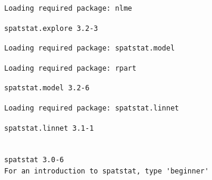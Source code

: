 \documentclass[
  letterpaper,
  DIV=11,
  numbers=noendperiod]{scrartcl}
\newenvironment{Shaded}{\begin{snugshade}}{\end{snugshade}}
\newcommand{\AttributeTok}[1]{\textcolor[rgb]{0.40,0.45,0.13}{#1}}
\newcommand{\FunctionTok}[1]{\textcolor[rgb]{0.28,0.35,0.67}{#1}}
\newcommand{\NormalTok}[1]{\textcolor[rgb]{0.00,0.23,0.31}{#1}}
\newcommand{\OtherTok}[1]{\textcolor[rgb]{0.00,0.23,0.31}{#1}}
\newcommand{\SpecialCharTok}[1]{\textcolor[rgb]{0.37,0.37,0.37}{#1}}
\newcommand{\StringTok}[1]{\textcolor[rgb]{0.13,0.47,0.30}{#1}}
\begin{document}
\begin{verbatim}
Loading required package: nlme
\end{verbatim}

\begin{verbatim}
spatstat.explore 3.2-3
\end{verbatim}

\begin{verbatim}
Loading required package: spatstat.model
\end{verbatim}

\begin{verbatim}
Loading required package: rpart
\end{verbatim}

\begin{verbatim}
spatstat.model 3.2-6
\end{verbatim}

\begin{verbatim}
Loading required package: spatstat.linnet
\end{verbatim}

\begin{verbatim}
spatstat.linnet 3.1-1
\end{verbatim}

\begin{verbatim}

spatstat 3.0-6 
For an introduction to spatstat, type 'beginner' 
\end{verbatim}

\begin{Shaded}
\end{Shaded}
\end{document}
